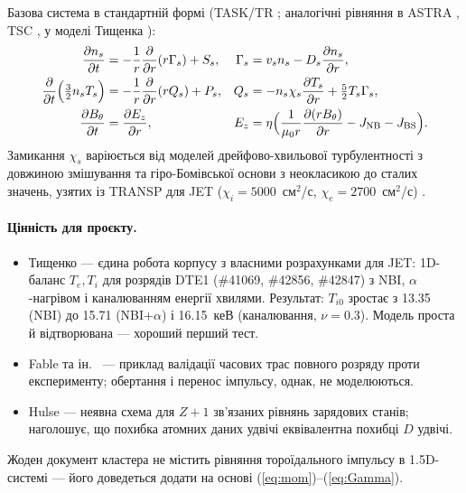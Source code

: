 \documentclass[11pt,a4paper]{article}
\begin{document}
Базова система в стандартній формі (TASK/TR \cite{Fukuyama1992}; аналогічні рівняння в ASTRA
\cite{Fable2022}, TSC \cite{Jardin2000}, у моделі Тищенка \cite{Tyshchenko2021}):
\begin{align}
  \frac{\partial n_s}{\partial t}&=-\frac1r\frac{\partial}{\partial r}(r\Gamma_s)+S_s,
  &\Gamma_s&=v_sn_s-D_s\frac{\partial n_s}{\partial r},\label{eq:n}\\
  \frac{\partial}{\partial t}\Big(\tfrac32n_sT_s\Big)&=-\frac1r\frac{\partial}{\partial r}(rQ_s)+P_s,
  &Q_s&=-n_s\chi_s\frac{\partial T_s}{\partial r}+\tfrac52T_s\Gamma_s,\label{eq:T}\\
  \frac{\partial B_\theta}{\partial t}&=\frac{\partial E_z}{\partial r},
  &E_z&=\eta\Big(\frac{1}{\mu_0r}\frac{\partial(rB_\theta)}{\partial r}-J_{\rm NB}-J_{\rm BS}\Big).\label{eq:B}
\end{align}
Замикання $\chi_s$ варіюється від моделей дрейфово-хвильової турбулентності
з довжиною змішування \cite{Fukuyama1992} та гіро-Бомівської основи з неокласикою
\cite{Fable2022} до сталих значень, узятих із TRANSP для JET
($\chi_i=5000$~см$^2$/с, $\chi_e=2700$~см$^2$/с) \cite{Tyshchenko2021}.

\paragraph{Цінність для проєкту.}
\begin{itemize}
  \item Тищенко \cite{Tyshchenko2021} --- єдина робота корпусу з власними
        розрахунками для JET: 1D-баланс $T_e,T_i$ для розрядів DTE1 (\#41069,
        \#42856, \#42847) з NBI, $\alpha$-нагрівом і каналюванням енергії хвилями.
        Результат: $T_{i0}$ зростає з 13.35 (NBI) до 15.71 (NBI+$\alpha$) і 16.15~кеВ
        (каналювання, $\nu=0.3$). Модель проста й відтворювана --- хороший перший тест.
  \item Fable та ін.\ \cite{Fable2022} --- приклад валідації часових трас повного
        розряду проти експерименту; обертання і перенос імпульсу, однак, не моделюються.
  \item Hulse \cite{Hulse1992} --- неявна схема для $Z+1$ зв'язаних рівнянь
        зарядових станів; наголошує, що похибка атомних даних удвічі еквівалентна
        похибці $D$ удвічі.
\end{itemize}
Жоден документ кластера не містить рівняння тороїдального імпульсу в
1.5D-системі --- його доведеться додати на основі (\ref{eq:mom})--(\ref{eq:Gamma}).
\end{document}
